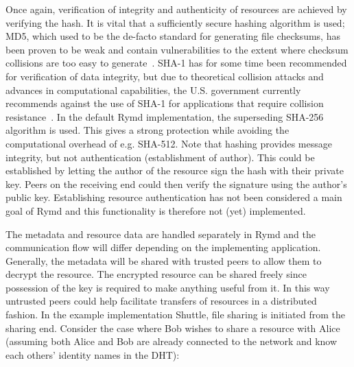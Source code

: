 Once again, verification of integrity and authenticity of resources are achieved by verifying the hash. It is vital that a sufficiently secure hashing algorithm is used; MD5, which used to be the de-facto standard for generating file checksums, has been proven to be weak and contain vulnerabilities to the extent where checksum collisions are too easy to generate~\cite{MD5Broken:Online}. SHA-1 has for some time been recommended for verification of data integrity, but due to theoretical collision attacks and advances in computational capabilities, the U.S. government currently recommends against the use of SHA-1 for applications that require collision resistance~\cite{NIST:2012}. In the default Rymd implementation, the superseding SHA-256 algorithm is used. This gives a strong protection while avoiding the computational overhead of e.g. SHA-512. Note that hashing provides message integrity, but not authentication (establishment of author). This could be established by letting the author of the resource sign the hash with their private key. Peers on the receiving end could then verify the signature using the author's public key. Establishing resource authentication has not been considered a main goal of Rymd and this functionality is therefore not (yet) implemented.

The metadata and resource data are handled separately in Rymd and the communication flow will differ depending on the implementing application. Generally, the metadata will be shared with trusted peers to allow them to decrypt the resource. The encrypted resource can be shared freely since possession of the key is required to make anything useful from it. In this way untrusted peers could help facilitate transfers of resources in a distributed fashion. In the example implementation Shuttle, file sharing is initiated from the sharing end. Consider the case where Bob wishes to share a resource with Alice (assuming both Alice and Bob are already connected to the network and know each others' identity names in the DHT):

